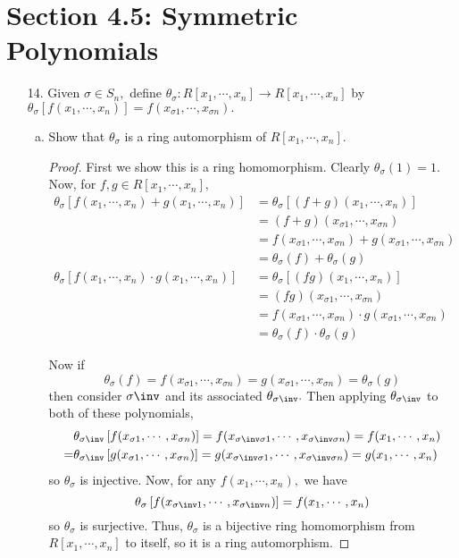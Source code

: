 \documentclass{article}
\begin{document}
\section*{Section 4.5: Symmetric Polynomials}

\begin{itemize}
	\item[14.] Given $\sigma\in S_n,$ define $\theta_\sigma: R[x_1, \cdots, x_n]\to R[x_1, \cdots, x_n]$ by $\theta_\sigma\left[ f(x_1, \cdots, x_n) \right]=f(x_{\sigma 1}, \cdots, x_{\sigma n}).$
		\begin{enumerate}[(a)]
			\item Show that $\theta_\sigma$ is a ring automorphism of $R[x_1, \cdots, x_n].$
				\begin{proof}
					First we show this is a ring homomorphism. Clearly $\theta_\sigma(1)=1.$ Now, for $f, g\in R[x_1, \cdots, x_n],$
					\begin{align*}
						\theta_\sigma\left[f(x_1, \cdots, x_n)+g(x_1, \cdots, x_n)\right] &= \theta_\sigma\left[ (f+g)(x_1, \cdots, x_n) \right] \\
						&= (f+g)(x_{\sigma1}, \cdots, x_{\sigma n}) \\
						&= f(x_{\sigma1}, \cdots, x_{\sigma n}) + g(x_{\sigma1}, \cdots, x_{\sigma n}) \\
						&= \theta_\sigma(f) + \theta_\sigma(g) \\
						\theta_\sigma\left[f(x_1, \cdots, x_n)\cdot g(x_1, \cdots, x_n)\right] &= \theta_\sigma\left[ (fg)(x_1, \cdots, x_n) \right] \\
						&= (fg)(x_{\sigma1}, \cdots, x_{\sigma n}) \\
						&= f(x_{\sigma1}, \cdots, x_{\sigma n}) \cdot g(x_{\sigma 1}, \cdots, x_{\sigma n}) \\
						&= \theta_\sigma(f)\cdot \theta_\sigma(g)
					\end{align*}

					Now if 
					\[\theta_\sigma(f)=f(x_{\sigma1}, \cdots, x_{\sigma n}) = g(x_{\sigma 1}, \cdots, x_{\sigma n}) = \theta_\sigma(g)\]
					then consider $\sigma\inv$ and its associated $\theta_{\sigma\inv}.$ Then applying $\theta_{\sigma\inv}$ to both of these polynomials, 
					\begin{align*}
						&\theta_{\sigma\inv} \left[ f(x_{\sigma1}, \cdots, x_{\sigma n}) \right] = f(x_{\sigma\inv\sigma1}, \cdots, x_{\sigma\inv\sigma n}) = f(x_1, \cdots, x_n) \\
						=&\theta_{\sigma\inv} \left[ g(x_{\sigma1}, \cdots, x_{\sigma n}) \right] = g(x_{\sigma\inv\sigma 1}, \cdots, x_{\sigma\inv\sigma n}) = g(x_1, \cdots, x_n) 
					\end{align*}
					so $\theta_\sigma$ is injective. Now, for any $f(x_1, \cdots, x_n),$ we have
					\[\theta_\sigma\left[ f(x_{\sigma\inv 1}, \cdots, x_{\sigma\inv n}) \right] = f(x_1, \cdots, x_n)\]
					so $\theta_\sigma$ is surjective. Thus, $\theta_\sigma$ is a bijective ring homomorphism from $R[x_1, \cdots, x_n]$ to itself, so it is a ring automorphism.
				\end{proof}


\end{enumerate}
\end{itemize}
\end{document}
